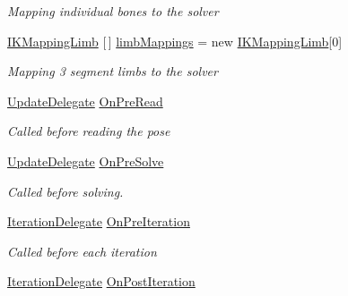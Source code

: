 \begin{DoxyCompactItemize}
\begin{DoxyCompactList}\small\item\em Mapping individual bones to the solver \end{DoxyCompactList}\item 
\mbox{\hyperlink{class_root_motion_1_1_final_i_k_1_1_i_k_mapping_limb}{I\+K\+Mapping\+Limb}} \mbox{[}$\,$\mbox{]} \mbox{\hyperlink{class_root_motion_1_1_final_i_k_1_1_i_k_solver_full_body_a5161bd901ca157bc668292d518fd4c9b}{limb\+Mappings}} = new \mbox{\hyperlink{class_root_motion_1_1_final_i_k_1_1_i_k_mapping_limb}{I\+K\+Mapping\+Limb}}\mbox{[}0\mbox{]}
\begin{DoxyCompactList}\small\item\em Mapping 3 segment limbs to the solver \end{DoxyCompactList}\item 
\mbox{\hyperlink{class_root_motion_1_1_final_i_k_1_1_i_k_solver_a237d83c7b9c6eace8a21aa5821f0a671}{Update\+Delegate}} \mbox{\hyperlink{class_root_motion_1_1_final_i_k_1_1_i_k_solver_full_body_a118a3650cb8bef7d81fe8081085be0a0}{On\+Pre\+Read}}
\begin{DoxyCompactList}\small\item\em Called before reading the pose \end{DoxyCompactList}\item 
\mbox{\hyperlink{class_root_motion_1_1_final_i_k_1_1_i_k_solver_a237d83c7b9c6eace8a21aa5821f0a671}{Update\+Delegate}} \mbox{\hyperlink{class_root_motion_1_1_final_i_k_1_1_i_k_solver_full_body_abcd3b4384631a4d61918d005ba2d3aaa}{On\+Pre\+Solve}}
\begin{DoxyCompactList}\small\item\em Called before solving. \end{DoxyCompactList}\item 
\mbox{\hyperlink{class_root_motion_1_1_final_i_k_1_1_i_k_solver_ae3da6a8ccd8224ce56d15c4da5cd1ef7}{Iteration\+Delegate}} \mbox{\hyperlink{class_root_motion_1_1_final_i_k_1_1_i_k_solver_full_body_a644052615e27543f862039ef09a8d2a3}{On\+Pre\+Iteration}}
\begin{DoxyCompactList}\small\item\em Called before each iteration \end{DoxyCompactList}\item 
\mbox{\hyperlink{class_root_motion_1_1_final_i_k_1_1_i_k_solver_ae3da6a8ccd8224ce56d15c4da5cd1ef7}{Iteration\+Delegate}} \mbox{\hyperlink{class_root_motion_1_1_final_i_k_1_1_i_k_solver_full_body_aac3eb5293a5bb82b528ff02995126ae2}{On\+Post\+Iteration}}

\end{DoxyCompactItemize}
